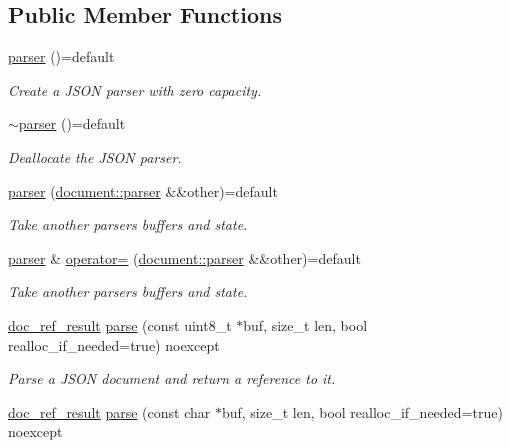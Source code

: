 \subsection*{Public Member Functions}
\begin{DoxyCompactItemize}
\item 
\hyperlink{classsimdjson_1_1document_1_1parser_a656d0ad716faf5085e885581ec598466}{parser} ()=default
\begin{DoxyCompactList}\small\item\em Create a J\+S\+ON parser with zero capacity. \end{DoxyCompactList}\item 
\hyperlink{classsimdjson_1_1document_1_1parser_a01e70a75fd87c764982b9e5f4e87eddf}{$\sim$parser} ()=default
\begin{DoxyCompactList}\small\item\em Deallocate the J\+S\+ON parser. \end{DoxyCompactList}\item 
\hyperlink{classsimdjson_1_1document_1_1parser_a1996defcd55a2bded7e01308fd21ae87}{parser} (\hyperlink{classsimdjson_1_1document_1_1parser}{document\+::parser} \&\&other)=default
\begin{DoxyCompactList}\small\item\em Take another parser\textquotesingle{}s buffers and state. \end{DoxyCompactList}\item 
\hyperlink{classsimdjson_1_1document_1_1parser}{parser} \& \hyperlink{classsimdjson_1_1document_1_1parser_ab59a0096c2192266961b2d1f9f449470}{operator=} (\hyperlink{classsimdjson_1_1document_1_1parser}{document\+::parser} \&\&other)=default
\begin{DoxyCompactList}\small\item\em Take another parser\textquotesingle{}s buffers and state. \end{DoxyCompactList}\item 
\hyperlink{classsimdjson_1_1document_1_1doc__ref__result}{doc\+\_\+ref\+\_\+result} \hyperlink{classsimdjson_1_1document_1_1parser_a3eb1fd46ea0dad62eceed4b1c302b7ad}{parse} (const uint8\+\_\+t $\ast$buf, size\+\_\+t len, bool realloc\+\_\+if\+\_\+needed=true) noexcept
\begin{DoxyCompactList}\small\item\em Parse a J\+S\+ON document and return a reference to it. \end{DoxyCompactList}\item 
\hyperlink{classsimdjson_1_1document_1_1doc__ref__result}{doc\+\_\+ref\+\_\+result} \hyperlink{classsimdjson_1_1document_1_1parser_a1ce12050358a969596ced70f9786c1cc}{parse} (const char $\ast$buf, size\+\_\+t len, bool realloc\+\_\+if\+\_\+needed=true) noexcept

\end{DoxyCompactItemize}
